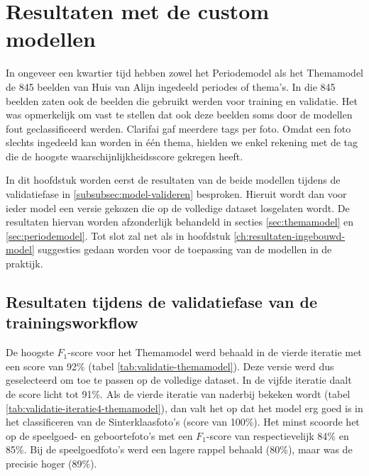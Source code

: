 \chapter{Resultaten met de custom  modellen}
\label{ch:resultaten-custom-model}

In ongeveer een kwartier tijd hebben zowel het Periodemodel als het Themamodel de 845 beelden van Huis van Alijn ingedeeld periodes of thema’s. In die 845 beelden zaten ook de beelden die gebruikt werden voor training en validatie. Het was opmerkelijk om vast te stellen dat ook deze beelden soms door de modellen fout geclassificeerd werden. Clarifai gaf meerdere tags per foto. Omdat een foto slechts ingedeeld kan worden in één thema, hielden we enkel rekening met de tag die de hoogste waarschijnlijkheidsscore gekregen heeft.

In dit hoofdstuk worden eerst de resultaten van de beide modellen tijdens de validatiefase in \ref{subsubsec:model-valideren} besproken. Hieruit wordt dan voor ieder model een versie gekozen die op de volledige dataset losgelaten wordt. De resultaten hiervan worden afzonderlijk behandeld in secties \ref{sec:themamodel} en \ref{sec:periodemodel}. Tot slot zal net als in hoofdstuk \ref{ch:resultaten-ingebouwd-model} suggesties gedaan worden voor de toepassing van de modellen in de praktijk.  

\section{Resultaten tijdens de validatiefase van de trainingsworkflow}

De hoogste $F_1$-score voor het Themamodel werd behaald in de vierde iteratie met een score van 92\% (tabel \ref{tab:validatie-themamodel}). Deze versie werd dus geselecteerd om toe te passen op de volledige dataset. In de vijfde iteratie daalt de score licht tot 91\%. Als de vierde iteratie van naderbij bekeken wordt (tabel \ref{tab:validatie-iteratie4-themamodel}), dan valt het op dat het model erg goed is in het classificeren van de Sinterklaasfoto’s (score van 100\%). Het minst scoorde het op de speelgoed- en geboortefoto’s met een $F_1$-score van respectievelijk 84\% en 85\%. Bij de speelgoedfoto’s werd een lagere rappel behaald (80\%), maar was de precisie hoger (89\%). 

